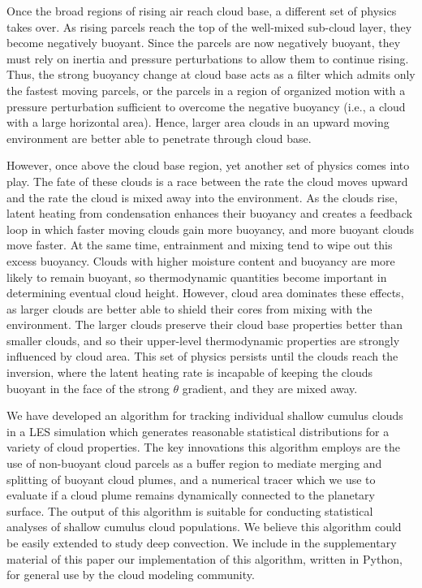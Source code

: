\documentclass[acp]{copernicus}
\begin{document}
Once the broad regions of rising air reach cloud base, a different set of 
physics takes over.  As rising parcels reach the top of the well-mixed 
sub-cloud layer, they become negatively buoyant.  Since the parcels are now 
negatively buoyant, they must rely on inertia and pressure perturbations to 
allow them to continue rising.  Thus, the strong buoyancy change at cloud base 
acts as a filter which admits only the fastest moving parcels, or the parcels 
in a region of organized motion with a pressure perturbation sufficient to 
overcome the negative buoyancy (i.e., a cloud with a large horizontal area).  
Hence, larger area clouds in an upward moving environment are better able to
penetrate through cloud base.

However, once above the cloud base region, yet another set of physics comes 
into play.  The fate of these clouds is a race between the rate the cloud moves 
upward and the rate the cloud is mixed away into the environment.  As the 
clouds rise, latent heating from condensation enhances their buoyancy and 
creates a feedback loop in which faster moving clouds gain more buoyancy, and 
more buoyant clouds move faster.  At the same time, entrainment and mixing 
tend to wipe out this excess buoyancy.  Clouds with higher moisture content and 
buoyancy are more likely to remain buoyant, so thermodynamic quantities become 
important in determining eventual cloud height.  However, cloud area dominates 
these effects, as larger clouds are better able to shield their cores from 
mixing with the environment.  The larger clouds preserve their cloud base 
properties better than smaller clouds, and so their upper-level thermodynamic 
properties are strongly influenced by cloud area.  This set of physics persists 
until the clouds reach the inversion, where the latent heating rate is 
incapable of keeping the clouds buoyant in the face of the strong $\theta$ 
gradient, and they are mixed away.


\conclusions
We have developed an algorithm for tracking individual shallow cumulus clouds 
in a LES simulation which generates reasonable statistical distributions for a 
variety of cloud properties.  The key innovations this algorithm employs are 
the use of non-buoyant cloud parcels as a buffer region to mediate merging and 
splitting of buoyant cloud plumes, and a numerical tracer which we use to 
evaluate if a cloud plume remains dynamically connected to the planetary 
surface.  The output of this algorithm is suitable for conducting statistical 
analyses of shallow cumulus cloud populations.  We believe this algorithm could 
be easily extended to study deep convection.  We include in the supplementary 
material of this paper our implementation of this algorithm, written in Python, 
for general use by the cloud modeling community.
\end{document}
